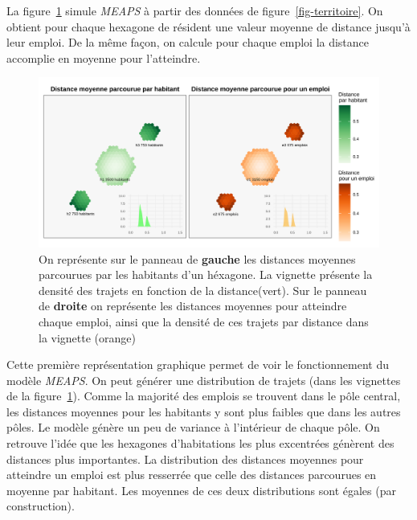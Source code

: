 \documentclass[
  10pt,
  a4paper,
  numbers=noendperiod,
  DIV=9]{scrartcl}
\begin{document}
La figure~\ref{fig-distances} simule \emph{MEAPS} à partir des données
de figure~\ref{fig-territoire}. On obtient pour chaque hexagone de
résident une valeur moyenne de distance jusqu'à leur emploi. De la même
façon, on calcule pour chaque emploi la distance accomplie en moyenne
pour l'atteindre.

\begin{figure}[htb]

{\centering \includegraphics[width=1\textwidth,height=\textheight]{output/gdistances.png}

}

\caption[Distances moyenne par habitant et pour un
emploi]{\label{fig-distances}On représente sur le panneau de
\textbf{gauche} les distances moyennes parcourues par les habitants d'un
héxagone. La vignette présente la densité des trajets en fonction de la
distance(vert). Sur le panneau de \textbf{droite} on représente les
distances moyennes pour atteindre chaque emploi, ainsi que la densité de
ces trajets par distance dans la vignette (orange)}

\end{figure}

Cette première représentation graphique permet de voir le fonctionnement
du modèle \emph{MEAPS}. On peut générer une distribution de trajets
(dans les vignettes de la figure~\ref{fig-distances}). Comme la majorité
des emplois se trouvent dans le pôle central, les distances moyennes
pour les habitants y sont plus faibles que dans les autres pôles. Le
modèle génère un peu de variance à l'intérieur de chaque pôle. On
retrouve l'idée que les hexagones d'habitations les plus excentrées
génèrent des distances plus importantes. La distribution des distances
moyennes pour atteindre un emploi est plus resserrée que celle des
distances parcourues en moyenne par habitant. Les moyennes de ces deux
distributions sont égales (par construction).
\end{document}
